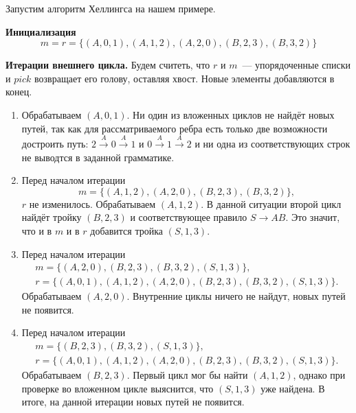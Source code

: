 \begin{example}
    Запустим алгоритм Хеллингса на нашем примере.

    \textbf{Инициализация}
    \[ m = r = \{(A,0,1),(A,1,2),(A,2,0),(B,2,3),(B,3,2)\} \]

    \textbf{Итерации внешнего цикла.}
    Будем считеть, что $r$ и $m$~--- упорядоченные списки и $pick$ возвращает его голову, оставляя хвост.
    Новые элементы добавляются в конец.
    \begin{enumerate}
        \item Обрабатываем $(A, 0, 1)$.
              Ни один из вложенных циклов не найдёт новых путей, так как для рассматриваемого ребра есть только две возможности достроить путь: $2 \xrightarrow{A} 0 \xrightarrow{A} 1$ и $0 \xrightarrow{A} 1 \xrightarrow{A} 2$
              и ни одна из соответствующих строк не выводтся в заданной грамматике.
        \item Перед началом итерации
              \[
                  m = \{(A, 1, 2), (A, 2, 0), (B, 2, 3), (B, 3, 2)\},
              \]
              $r$ не изменилось.
              Обрабатываем $(A, 1, 2)$.
              В данной ситуации второй цикл найдёт тройку $(B, 2, 3)$ и соответствующее правило $S \to A B$.
              Это значит, что и в $m$ и в $r$ добавится тройка $(S, 1, 3)$.
        \item Перед началом итерации
              \begin{gather*}
                  m = \{(A, 2, 0), (B, 2, 3), (B, 3, 2), (S, 1, 3)\},                        \\
                  r = \{(A, 0, 1), (A, 1, 2), (A, 2, 0), (B, 2, 3), (B, 3, 2), (S, 1, 3)\}.
              \end{gather*}
              Обрабатываем $(A, 2, 0)$.
              Внутренние циклы ничего не найдут, новых путей не появится.
        \item Перед началом итерации
              \begin{gather*}
                  m = \{(B, 2, 3), (B, 3, 2), (S, 1, 3)\},\\
                  r = \{(A, 0, 1), (A, 1, 2), (A, 2, 0), (B, 2, 3), (B, 3, 2), (S, 1, 3)\}.
              \end{gather*}
              Обрабатываем $(B, 2, 3)$.
              Первый цикл мог бы найти $(A, 1, 2)$, однако при проверке во вложенном цикле выяснится, что $(S, 1, 3)$ уже найдена.
              В итоге, на данной итерации новых путей не появится.

\end{enumerate}
\end{example}
